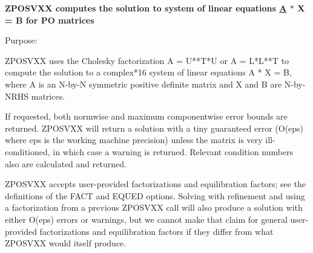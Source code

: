 {\bfseries  Z\+P\+O\+S\+V\+X\+X computes the solution to system of linear equations \hyperlink{classA}{A} $\ast$ X = B for P\+O matrices} 

 \begin{DoxyParagraph}{Purpose\+: }
\begin{DoxyVerb}    ZPOSVXX uses the Cholesky factorization A = U**T*U or A = L*L**T
    to compute the solution to a complex*16 system of linear equations
    A * X = B, where A is an N-by-N symmetric positive definite matrix
    and X and B are N-by-NRHS matrices.

    If requested, both normwise and maximum componentwise error bounds
    are returned. ZPOSVXX will return a solution with a tiny
    guaranteed error (O(eps) where eps is the working machine
    precision) unless the matrix is very ill-conditioned, in which
    case a warning is returned. Relevant condition numbers also are
    calculated and returned.

    ZPOSVXX accepts user-provided factorizations and equilibration
    factors; see the definitions of the FACT and EQUED options.
    Solving with refinement and using a factorization from a previous
    ZPOSVXX call will also produce a solution with either O(eps)
    errors or warnings, but we cannot make that claim for general
    user-provided factorizations and equilibration factors if they
    differ from what ZPOSVXX would itself produce.\end{DoxyVerb}
 
\end{DoxyParagraph}
